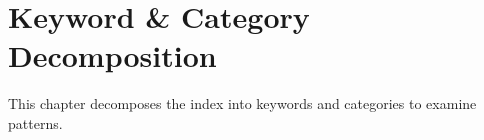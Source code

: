 
\chapter{Keyword \& Category Decomposition}

This chapter decomposes the index into keywords and categories to examine patterns.

